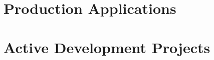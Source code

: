 \documentclass[11pt,a4paper,sans]{moderncv}
\begin{document}
\makecvtitle



\vspace{0.5em}



\vspace{0.5em}

\section{Production Applications}


\vspace{0.5em}

\section{Active Development Projects}


\vspace{0.5em}



\vspace{0.5em}


\end{document}
